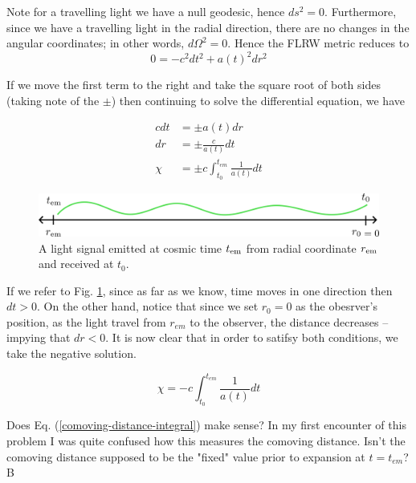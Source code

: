 \documentclass[a4paper,11pt]{article}
\begin{document}
Note for a travelling light we have a null geodesic, hence $ds^2=0$. 
Furthermore, since we have a travelling light in the radial direction,
there are no changes in the angular coordinates; in other words, $d\Omega^2 = 0$. 
Hence the FLRW metric reduces to
\begin{equation}
    0 = -c^2 dt^2 + a(t)^2 dr^2
    \label{null-geodesic-flrw}
\end{equation}

If we move the first term to the right and take the square root of both sides (taking note of the $\pm$)
then continuing to solve the differential equation, we have

\begin{align}
     cdt &= \pm a(t) dr\\
     dr &= \pm \frac{c}{a(t)} dt\\
     \chi &= \pm c \int_{t_0}^{t_{em}} \frac{1}{a(t)} dt
\end{align}

\begin{figure}[H]
\centering
\def\imgwidth{0.65\linewidth}
\includegraphics[width=\imgwidth]{pasted-images/comovinglight.png}
\caption{A light signal emitted at cosmic time $t_{\rm em}$ from radial coordinate $r_{\rm em}$ and received at $t_0$.}
\label{fig:comovinglight}
\end{figure}


If we refer to Fig. \ref{fig:comovinglight}, since as far as we know, time moves in one direction
then $dt>0$. On the other hand, notice that since we set $r_0=0$ as the obesrver's position,
as the light travel from $r_{em}$ to the observer, the distance decreases -- impying that $dr<0$.
It is now clear that in order to satifsy both conditions, we take the negative solution.

\begin{equation}
    \chi = -c \int_{t_0}^{t_{em}} \frac{1}{a(t)} dt
    \label{comoving-distance-integral}
\end{equation}

Does Eq. (\ref{comoving-distance-integral}) make sense? In my first encounter of this problem I was 
quite confused how this measures the comoving distance. Isn't the comoving distance supposed to be 
the "fixed" value prior to expansion at $t=t_{em}$? B
\end{document}

